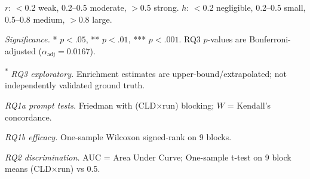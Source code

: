 \begin{table}[H]
\begin{threeparttable}
\begin{tablenotes}[flushleft]
\item $r$: $<$0.2 weak, 0.2--0.5 moderate, $>$0.5 strong. $h$: $<$0.2 negligible, 0.2--0.5 small, 0.5--0.8 medium, $>$0.8 large.
\item \textit{Significance.} * $p<.05$, ** $p<.01$, *** $p<.001$. RQ3 $p$-values are Bonferroni-adjusted ($\alpha_{\text{adj}}=0.0167$).
\item \textsuperscript{$\ast$} \textit{RQ3 exploratory.} Enrichment estimates are upper-bound/extrapolated; not independently validated ground truth.
\item \textit{RQ1a prompt tests.} Friedman with (CLD$\times$run) blocking; $W$ = Kendall's concordance.
\item \textit{RQ1b efficacy.} One-sample Wilcoxon signed-rank on 9 blocks.
\item \textit{RQ2 discrimination.} AUC = Area Under Curve; One-sample t-test on 9 block means (CLD$\times$run) vs 0.5.
\end{tablenotes}
\end{threeparttable}
\end{table}